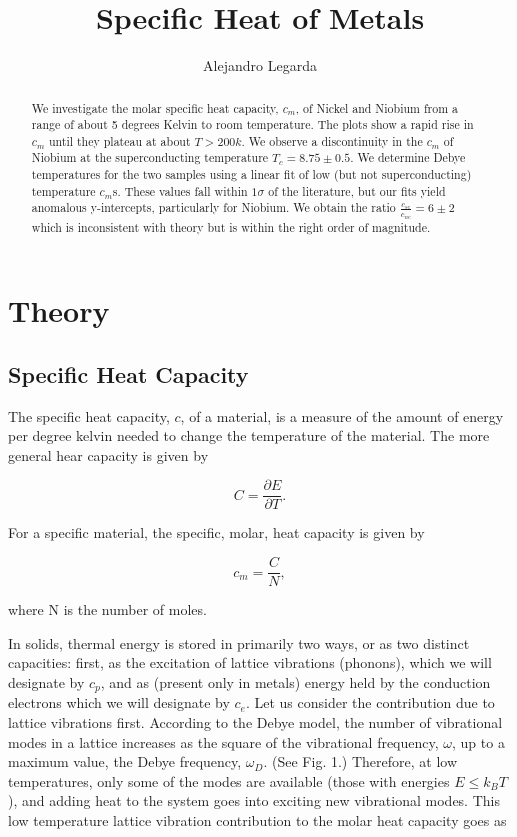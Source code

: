 \documentclass{article}
\title{Specific Heat of Metals}
\author{Alejandro Legarda}
\begin{document}
\raggedright
\maketitle

\begin{abstract}
We investigate the molar specific heat capacity, $c_m$, of Nickel and Niobium from a range of about 5 degrees Kelvin to room temperature. The plots show a rapid rise in $c_m$ until they plateau at about $T > 200k$. We observe a discontinuity in the $c_m$ of Niobium at the superconducting temperature $T_c = 8.75 \pm 0.5$. We determine Debye temperatures for the two samples using a linear fit of low (but not superconducting) temperature $c_m$s. These values fall within $1\sigma$ of the literature, but our fits yield anomalous y-intercepts, particularly for Niobium. We obtain the ratio $\frac{c_{se}}{c_{ne}} = 6 \pm 2$ which is inconsistent with theory but is within the right order of magnitude.
\end{abstract}
	
	
\tableofcontents
\newpage

\section{Theory}

\subsection{Specific Heat Capacity}

The specific heat capacity, $c$, of a material, is a measure of the amount of energy per degree kelvin needed to change the temperature of the material. The more general hear capacity is given by

\begin{equation}
	C = \frac{\partial E}{\partial T}.
\end{equation}

For a specific material, the specific, molar, heat capacity is given by

\begin{equation}
	c_m = \frac{C}{N},
\end{equation}

where N is the number of moles.

\hspace{.25cm}

In solids, thermal energy is stored in primarily two ways, or as two distinct capacities: first, as the excitation of lattice vibrations (phonons), which we will designate by $c_p$, and as (present only in metals) energy held by the conduction electrons which we will designate by $c_e$. Let us consider the contribution due to lattice vibrations first.
According to the Debye model, the number of vibrational modes in a lattice increases as the square of the vibrational frequency, $\omega$, up to a maximum value, the Debye frequency, $\omega_D$. (See Fig. 1.) Therefore, at low temperatures, only some of the modes are available (those with energies $E \leq k_B T$), and adding heat to the system goes into exciting new vibrational modes. This low temperature lattice vibration contribution to the molar heat capacity goes as
\end{document}

